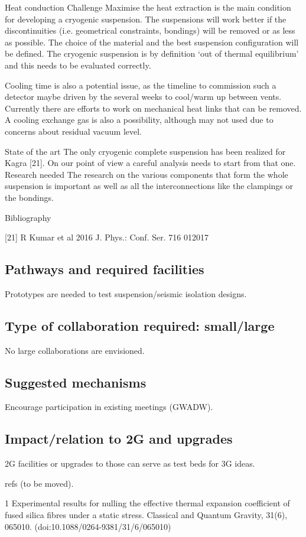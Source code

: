 Heat conduction
Challenge
Maximise the heat extraction is the main condition for developing a cryogenic suspension. The suspensions will work better if the discontinuities (i.e. geometrical constraints, bondings) will be removed or as less as possible. The choice of the material and the best suspension configuration will be defined. The cryogenic suspension is by definition ‘out of thermal equilibrium’ and this needs to be evaluated correctly.

Cooling time is also a potential issue, as the timeline to commission such a detector maybe driven by the several weeks to cool/warm up between vents. Currently there are efforts to work on mechanical heat links that can be removed. A cooling exchange gas is also a possibility, although may not used due to concerns about residual vacuum level.

State of the art
The only cryogenic complete suspension has been realized for Kagra [21]. On our point of view a careful analysis needs to start from that one.
Research needed
The research on the various components that form the whole suspension is important as well as all the interconnections like the clampings or the bondings. 

Bibliography

[21] R Kumar et al 2016 J. Phys.: Conf. Ser. 716 012017

\subsection{Pathways and required facilities}
Prototypes are needed to test suspension/seismic isolation designs. 
\subsection{Type of collaboration required:  small/large}
No large collaborations are envisioned. 
\subsection{Suggested mechanisms}
Encourage participation in existing meetings (GWADW). 
\subsection{Impact/relation to 2G and upgrades}
2G facilities or upgrades to those can serve as test beds for 3G ideas. 

refs (to be moved).

1 Experimental results for nulling the effective thermal expansion coefficient of fused silica fibres under a static stress. Classical and Quantum Gravity, 31(6), 065010. (doi:10.1088/0264-9381/31/6/065010)

